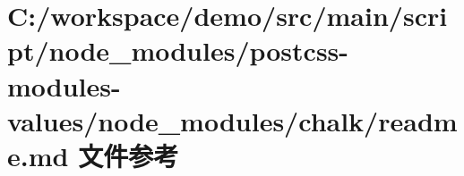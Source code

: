 \hypertarget{node__modules_2postcss-modules-values_2node__modules_2chalk_2_r_e_a_d_m_e_8md}{}\section{C\+:/workspace/demo/src/main/script/node\+\_\+modules/postcss-\/modules-\/values/node\+\_\+modules/chalk/readme.md 文件参考}
\label{node__modules_2postcss-modules-values_2node__modules_2chalk_2_r_e_a_d_m_e_8md}
